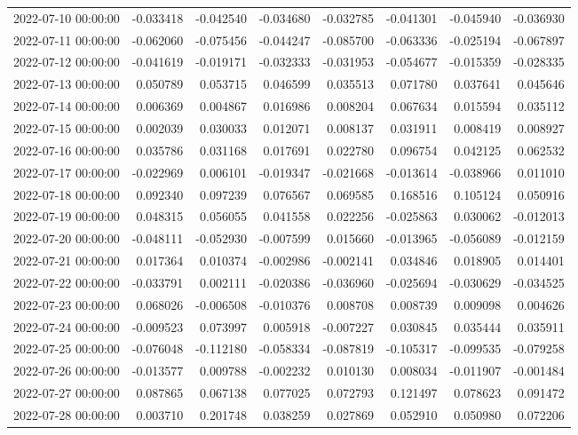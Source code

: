 \begin{tabular}{lrrrrrrr}
2022-07-10 00:00:00 & -0.033418 & -0.042540 & -0.034680 & -0.032785 & -0.041301 & -0.045940 & -0.036930 \\
2022-07-11 00:00:00 & -0.062060 & -0.075456 & -0.044247 & -0.085700 & -0.063336 & -0.025194 & -0.067897 \\
2022-07-12 00:00:00 & -0.041619 & -0.019171 & -0.032333 & -0.031953 & -0.054677 & -0.015359 & -0.028335 \\
2022-07-13 00:00:00 & 0.050789 & 0.053715 & 0.046599 & 0.035513 & 0.071780 & 0.037641 & 0.045646 \\
2022-07-14 00:00:00 & 0.006369 & 0.004867 & 0.016986 & 0.008204 & 0.067634 & 0.015594 & 0.035112 \\
2022-07-15 00:00:00 & 0.002039 & 0.030033 & 0.012071 & 0.008137 & 0.031911 & 0.008419 & 0.008927 \\
2022-07-16 00:00:00 & 0.035786 & 0.031168 & 0.017691 & 0.022780 & 0.096754 & 0.042125 & 0.062532 \\
2022-07-17 00:00:00 & -0.022969 & 0.006101 & -0.019347 & -0.021668 & -0.013614 & -0.038966 & 0.011010 \\
2022-07-18 00:00:00 & 0.092340 & 0.097239 & 0.076567 & 0.069585 & 0.168516 & 0.105124 & 0.050916 \\
2022-07-19 00:00:00 & 0.048315 & 0.056055 & 0.041558 & 0.022256 & -0.025863 & 0.030062 & -0.012013 \\
2022-07-20 00:00:00 & -0.048111 & -0.052930 & -0.007599 & 0.015660 & -0.013965 & -0.056089 & -0.012159 \\
2022-07-21 00:00:00 & 0.017364 & 0.010374 & -0.002986 & -0.002141 & 0.034846 & 0.018905 & 0.014401 \\
2022-07-22 00:00:00 & -0.033791 & 0.002111 & -0.020386 & -0.036960 & -0.025694 & -0.030629 & -0.034525 \\
2022-07-23 00:00:00 & 0.068026 & -0.006508 & -0.010376 & 0.008708 & 0.008739 & 0.009098 & 0.004626 \\
2022-07-24 00:00:00 & -0.009523 & 0.073997 & 0.005918 & -0.007227 & 0.030845 & 0.035444 & 0.035911 \\
2022-07-25 00:00:00 & -0.076048 & -0.112180 & -0.058334 & -0.087819 & -0.105317 & -0.099535 & -0.079258 \\
2022-07-26 00:00:00 & -0.013577 & 0.009788 & -0.002232 & 0.010130 & 0.008034 & -0.011907 & -0.001484 \\
2022-07-27 00:00:00 & 0.087865 & 0.067138 & 0.077025 & 0.072793 & 0.121497 & 0.078623 & 0.091472 \\
2022-07-28 00:00:00 & 0.003710 & 0.201748 & 0.038259 & 0.027869 & 0.052910 & 0.050980 & 0.072206 \\

\end{tabular}
